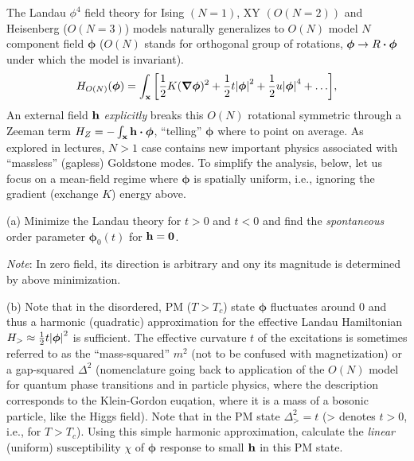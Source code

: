 \documentclass[12pt]{article}
\begin{document}
\newpage
\begin{problem}{4}

The Landau $\phi^4$ field theory for Ising $(N=1)$, XY $(O(N=2))$ and 
Heisenberg ($O(N=3)$) models naturally generalizes to $O(N)$ model $N$ component
field $\bm\phi$ ($O(N)$ stands for orthogonal group of rotations, $\bm\phi\to
R\vdot\bm\phi$ under which the model is invariant).
\begin{equation}
    H_{O(N)}(\bm\phi)=\int_{\vb{x}}\qty[\frac12K(\grad\bm\phi)^2+\frac12t\abs{\bm\phi}^2+\frac12u\abs{\bm\phi}^4+\hdots], 
\end{equation}
An external field $\vb{h}$ \textit{explicitly} breaks this $O(N)$ rotational
symmetric through a Zeeman term $H_Z=-\int_{\vb{x}}\vb{h}\vdot\bm\phi$,
``telling'' $\bm\phi$ where to point on average. As explored in lectures, $N>1$
case contains new important physics associated with ``massless'' (gapless)
Goldstone modes. To simplify the analysis, below, let us focus on a mean-field
regime where $\bm\phi$ is spatially uniform, i.e., ignoring the gradient
(exchange $K$) energy above.

(a) Minimize the Landau theory for $t>0$ and $t<0$ and find the
\textit{spontaneous} order parameter $\bm\phi_0(t)$ for $\vb{h}=\vb{0}$.

\textit{Note}: In zero field, its direction is arbitrary and ony its magnitude
is determined by above minimization.

(b) Note that in the disordered, PM ($T>T_c$) state $\bm\phi$ fluctuates around
0 and thus a harmonic (quadratic) approximation for the effective Landau
Hamiltonian $H_>\approx\frac12 t\abs{\bm\phi}^2$ is sufficient. The effective
curvature $t$ of the excitations is sometimes referred to as the
``mass-squared'' $m^2$ (not to be confused with magnetization) or a gap-squared
$\Delta^2$ (nomenclature going back to application of the $O(N)$ model for
quantum phase transitions and in particle physics, where the description
corresponds to the Klein-Gordon euqation, where it is a mass of a bosonic
particle, like the Higgs field). Note that in the PM state $\Delta_>^2=t$ (>
denotes $t>0$, i.e., for $T>T_c$). Using this simple harmonic approximation,
calculate the \textit{linear} (uniform) susceptibility $\chi$ of $\bm\phi$
response to small $\vb{h}$ in this PM state.


\end{problem}
\end{document}
